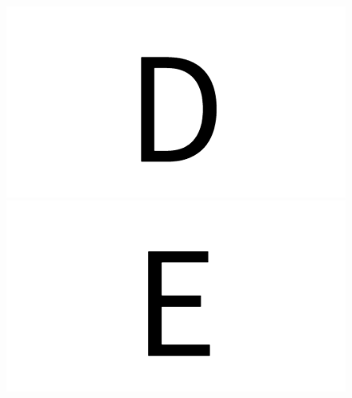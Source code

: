 \documentclass{article}
\begin{document}
\begin{figure}[H]
  \includegraphics[width=\linewidth]{u_D}
\endminipage\hfill
{}
  \includegraphics[width=\linewidth]{u_E}
\endminipage\hfill
\end{figure}
\end{document}
